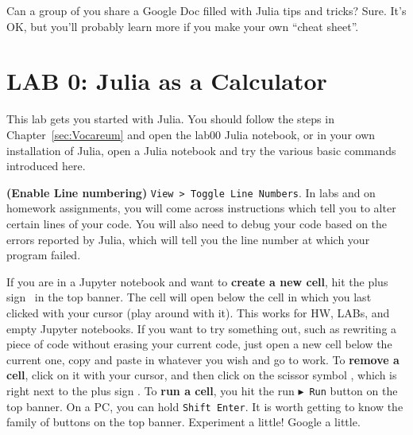 Can a group of you share a Google Doc filled with Julia tips and tricks? Sure. It's OK, but you'll probably learn more if you make your own ``cheat sheet''.


\vspace*{.2cm}
\setlength{\fboxrule}{3pt}%
	\centerline{ %
}

\section{LAB 0: Julia as a Calculator}

This lab gets you started with Julia. You should follow the steps in Chapter~\ref{sec:Vocareum} and open the lab00 Julia notebook, or in your own installation of Julia, open a Julia notebook and try the various basic commands introduced here.\\

\setlength{\fboxrule}{3pt}%
	\centerline{ %
}



\begin{rem} \textbf{(Enable Line numbering)} \texttt{View > Toggle Line Numbers}. In labs and on homework assignments, you will come across instructions which tell you to alter certain lines of your code. You will also need to debug your code based on the errors reported by Julia, which will tell you the line number at which your program failed. 
\end{rem}

If you are in a Jupyter notebook and want to \textbf{create a new cell}, hit the plus sign  \Plus ~in the top banner. The cell will open below the cell in which you last clicked with your cursor (play around with it). This works for HW, LABs, and empty Jupyter notebooks. If you want to try something out, such as rewriting a piece of code without erasing your current code, just open a new cell below the current one, copy and paste in whatever you wish and go to work. To \textbf{remove a cell}, click on it with your cursor, and then click on the scissor symbol \ScissorHollowRight, which is right next to the plus sign \Plus. To \textbf{run a cell}, you hit the run $\blacktriangleright$~\texttt{Run} button on the top banner. On a PC, you can hold \texttt{Shift Enter}. It is worth getting to know the family of buttons on the top banner. Experiment a little! Google a little.\\

